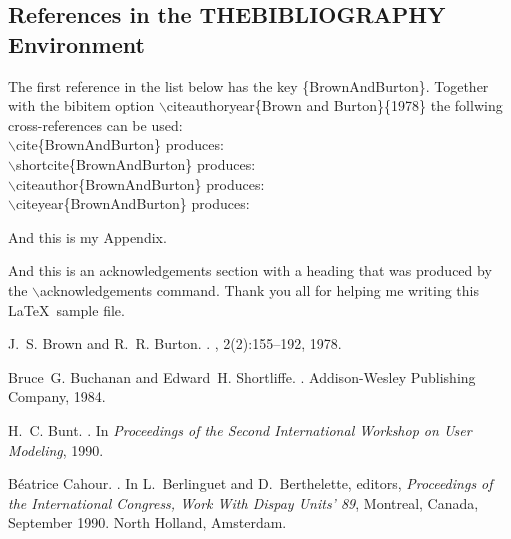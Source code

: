 \documentclass{kluwer}    %
\begin{document}
\begin{article}
\section{References in the THEBIBLIOGRAPHY Environment}
The first reference in the list below has the key \{BrownAndBurton\}.
Together with the bibitem option $\backslash$citeauthoryear\{Brown and
Burton\}\{1978\} the follwing cross-references can be used:\\
$\backslash$cite\{BrownAndBurton\} produces: \cite{BrownAndBurton}\\
$\backslash$shortcite\{BrownAndBurton\}  produces: \\  
$\backslash$citeauthor\{BrownAndBurton\}  produces: \citeauthor{BrownAndBurton}\\  
$\backslash$citeyear\{BrownAndBurton\}  produces: \citeyear{BrownAndBurton}\\  


\appendix

And this is my Appendix.


\acknowledgements
And this is an acknowledgements section with a heading that was produced by the
$\backslash$acknowledgements command. Thank you all for helping me writing this
\LaTeX\ sample file.


\theendnotes

\begin{thebibliography}{}

J.~S. Brown and R.~R. Burton.
.
, 2(2):155--192, 1978.

Bruce~G. Buchanan and Edward~H. Shortliffe.
.
\newblock Addison-Wesley Publishing Company, 1984.

H.~C. Bunt.
.
\newblock In {\em Proceedings of the Second International Workshop on User
  Modeling}, 1990.

B\'eatrice Cahour.
.
\newblock In L.~Berlinguet and D.~Berthelette, editors, {\em Proceedings of the
  International Congress, Work With Dispay Units' 89}, Montreal, Canada,
  September 1990. North Holland, Amsterdam.


\end{thebibliography}
\end{article}
\end{document}
